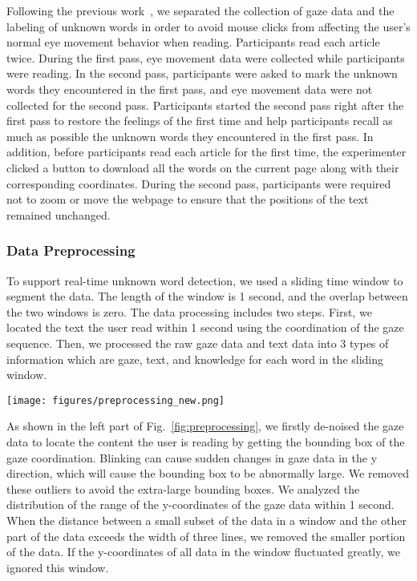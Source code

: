 Following the previous work~\cite{gaze-text_garain_2017}, we separated the collection of gaze data and the labeling of unknown words in order to avoid mouse clicks from affecting the user's normal eye movement behavior when reading. Participants read each article twice. During the first pass, eye movement data were collected while participants were reading. In the second pass, participants were asked to mark the unknown words they encountered in the first pass, and eye movement data were not collected for the second pass. Participants started the second pass right after the first pass to restore the feelings of the first time and help participants recall as much as possible the unknown words they encountered in the first pass. In addition, before participants read each article for the first time, the experimenter clicked a button to download all the words on the current page along with their corresponding coordinates. During the second pass, participants were required not to zoom or move the webpage to ensure that the positions of the text remained unchanged.

\subsubsection{Data Preprocessing}
To support real-time unknown word detection, we used a sliding time window to segment the data. The length of the window is 1 second, and the overlap between the two windows is zero. The data processing includes two steps. First, we located the text the user read within 1 second using the coordination of the gaze sequence. Then, we processed the raw gaze data and text data into 3 types of information which are gaze, text, and knowledge for each word in the sliding window.

\begin{figure*}[htbp]
  \centering
  \texttt{[image: figures/preprocessing\_new.png]}
  \caption{A bounding box is derived from the gaze coordination within a 1-second sliding window. The gaze data, token-level text data, and word-level knowledge data are calculated for each candidate word in the bounding box.}
  \label{fig:preprocessing} 
\end{figure*}

As shown in the left part of Fig.~\ref{fig:preprocessing}, we firstly de-noised the gaze data to locate the content the user is reading by getting the bounding box of the gaze coordination. Blinking can cause sudden changes in gaze data in the y direction, which will cause the bounding box to be abnormally large. We removed these outliers to avoid the extra-large bounding boxes. We analyzed the distribution of the range of the y-coordinates of the gaze data within 1 second. When the distance between a small subset of the data in a window and the other part of the data exceeds the width of three lines, we removed the smaller portion of the data. If the y-coordinates of all data in the window fluctuated greatly, we ignored this window.

